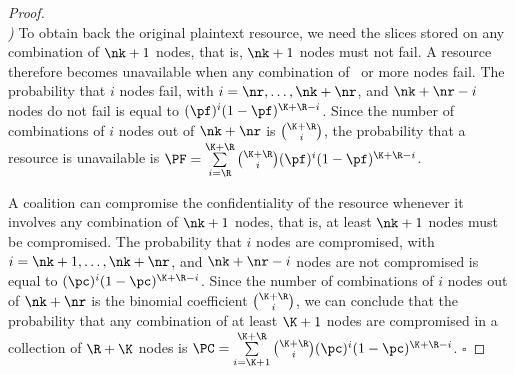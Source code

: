 \medskip

\begin{proof}
	\hfill\\
	{\em \PF)\/} To obtain back the original plaintext
	resource, we need the slices stored on any combination of $\nk+1$
	nodes, that is, $\nk+1$ nodes must not fail. A resource therefore
	becomes unavailable when any combination of \nr\ or more nodes
	fail. The probability that $i$ nodes fail, with
	$i=\nr,\ldots,\nk+\nr$, and $\nk+\nr-i$ nodes do not fail is
	equal to $ (\pf)^i (1 - \pf)^{{\K}+{\R}-i}$.  Since the number of
	combinations of $i$ nodes out of $\nk+\nr$ is
	${{\K+\R}\choose{i}}$, the probability that a resource is
	unavailable is $\PF= \sum\limits_{i={\R}}^{{\K}+{\R}}
	{{\K+\R}\choose{i}} (\pf)^i (1 - \pf)^{{\K}+{\R}-i}$.
	
	\medskip
	
	\noindent {\em  \PC)\/} A coalition can compromise the confidentiality
	of the resource whenever it involves any combination of $\nk+1$
	nodes, that is, at least $\nk+1$ nodes must be compromised. The
	probability that $i$ nodes are compromised, with
	$i=\nk+1,\ldots,\nk+\nr$, and $\nk+\nr-i$ nodes are not compromised
	is equal to $(\pc)^i (1 - \pc)^{{\K}+{\R}-i}$.  Since the number of
	combinations of $i$ nodes out of $\nk+\nr$ is the binomial
	coefficient ${{\K+\R}\choose{i}}$, we can conclude that the
	probability that any combination of at least $\K+1$ nodes are
	compromised in a collection of $\R+\K$ nodes is $\PC=
	\sum\limits_{i={\K}+1}^{{\K}+{\R}} {{\K+\R}\choose{i}} (\pc)^i (1 -
	\pc)^{{\K}+{\R}-i}$.
	{\hfill $\square$}
 \end{proof}
